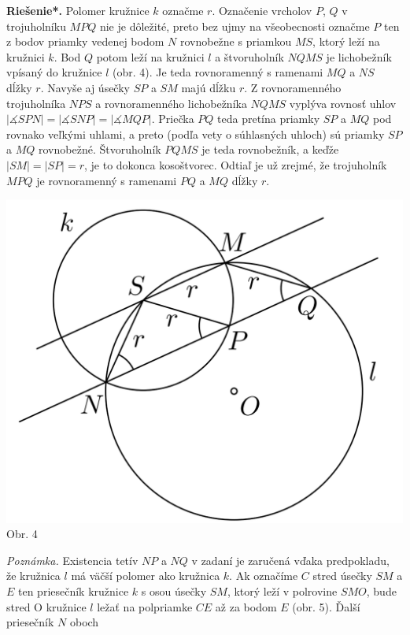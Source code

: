 \documentclass[11pt,a4paper,oneside,final]{book}
\newcommand{\rieh}{\textbf{Riešenie*.} }
\newcommand{\ma}{\measuredangle}
\begin{document}
\rieh Polomer kružnice $k$ označme $r$. Označenie vrcholov $P$, $Q$ v trojuholníku $MPQ$ nie je dôležité, preto bez ujmy na všeobecnosti označme $P$ ten z bodov priamky vedenej bodom $N$ rovnobežne s priamkou $MS$, ktorý leží na kružnici $k$. Bod $Q$ potom leží na kružnici $l$ a štvoruholník $NQMS$ je lichobežník vpísaný do kružnice $l$ (obr. 4). Je teda rovnoramenný s ramenami $MQ$ a $NS$ dĺžky $r$. Navyše aj úsečky $SP$ a $SM$ majú dĺžku $r$. Z rovnoramenného trojuholníka $NPS$ a rovnoramenného lichobežníka $NQMS$ vyplýva rovnosť uhlov $|\ma SPN| = |\ma SNP| = |\ma MQP|$. Priečka $PQ$ teda pretína priamky $SP$ a $MQ$ pod rovnako veľkými uhlami, a preto (podľa vety o súhlasných uhloch) sú priamky $SP$ a $MQ$ rovnobežné. Štvoruholník $PQMS$ je teda rovnobežník, a keďže $|SM| = |SP| = r$, je to dokonca kosoštvorec. Odtiaľ je už zrejmé, že trojuholník $MPQ$ je rovnoramenný s ramenami $PQ$ a $MQ$ dĺžky $r$.
\begin{center}
\includegraphics{59K31}\\

Obr. 4
\end{center}
\textit{Poznámka.} Existencia tetív $NP$ a $NQ$ v zadaní je zaručená vďaka predpokladu, že kružnica $l$ má väčší polomer ako kružnica $k$. Ak označíme $C$ stred úsečky $SM$ a $E$ ten priesečník kružnice $k$ s osou úsečky $SM$, ktorý leží v polrovine $SMO$, bude stred O kružnice $l$ ležať na polpriamke $CE$ až za bodom $E$ (obr. 5). Ďalší priesečník $N$ oboch
\end{document}
